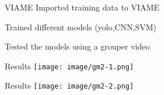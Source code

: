 \begin{frame}{VIAME}
    Imported training data to VIAME 

    Trained different models (yolo,CNN,SVM)

    Tested the models using a grouper video

\end{frame}


\begin{frame}{Results}
    \centering
    \texttt{[image: image/gm2-1.png]}

\end{frame}

\begin{frame}{Results}
    \centering
    \texttt{[image: image/gm2-2.png]}

\end{frame}






